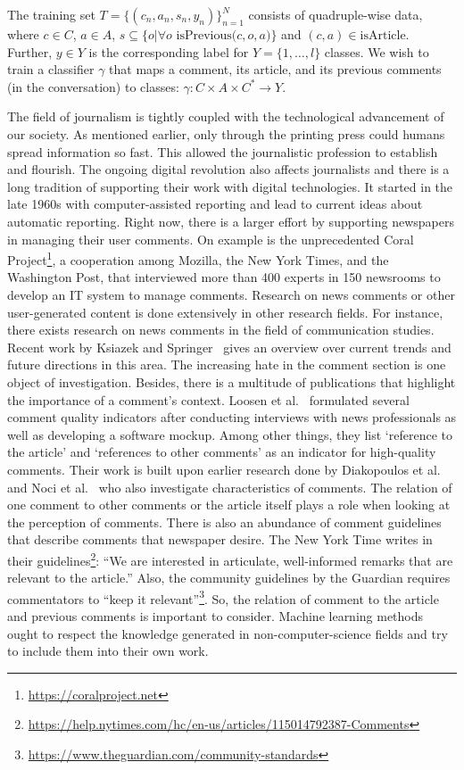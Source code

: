 The training set $T =\{(c_n, a_n, s_n, y_n)\}^N_{n=1}$ consists of quadruple-wise data, where $c \in C$, $a \in A$, $s \subseteq \{o | \forall o \text{ isPrevious(}c,o,a)\}$ and $(c, a) \in \text{isArticle}$.
Further, $y \in Y $ is the corresponding label for $Y=\{1,\dotsc, l\}$ classes.
We wish to train a classifier $\gamma$ that maps a comment, its article, and its previous comments (in the conversation) to classes: $\gamma: C \times A \times C^* \rightarrow Y$.

The field of journalism is tightly coupled with the technological advancement of our society. As mentioned earlier, only through the printing press could humans spread information so fast. This allowed the journalistic profession to establish and flourish. The ongoing digital revolution also affects journalists and there is a long tradition of supporting their work with digital technologies. It started in the late 1960s with computer-assisted reporting and lead to current ideas about automatic reporting. Right now, there is a larger effort by supporting newspapers in managing their user comments. On example is the unprecedented Coral Project\footnote{\url{https://coralproject.net}}, a cooperation among Mozilla, the New York Times, and the Washington Post, that interviewed more than 400 experts in 150 newsrooms to develop an IT system to manage comments. Research on news comments or other user-generated content is done extensively in other research fields. For instance, there exists research on news comments in the field of communication studies. Recent work by Ksiazek and Springer~\cite{eldridge_ii_user_2018} gives an overview over current trends and future directions in this area. The increasing hate in the comment section is one object of investigation. Besides, there is a multitude of publications that highlight the importance of a comment's context. Loosen et al.~\cite{loosen_making_2017} formulated several comment quality indicators after conducting interviews with news professionals as well as developing a software mockup. Among other things, they list `reference to the article' and `references to other comments' as an indicator for high-quality comments. Their work is built upon earlier research done by Diakopoulos et al.~\cite{Diakopoulos:2011:TQD:1958824.1958844} and Noci et al.~\cite{noci2012comments} who also investigate characteristics of comments. The relation of one comment to other comments or the article itself plays a role when looking at the perception of comments. There is also an abundance of comment guidelines that describe comments that newspaper desire. The New York Time writes in their guidelines\footnote{\url{https://help.nytimes.com/hc/en-us/articles/115014792387-Comments}}: ``We are interested in articulate, well-informed remarks that are relevant to the article.'' Also, the community guidelines by the Guardian requires commentators to ``keep it relevant''\footnote{\url{https://www.theguardian.com/community-standards}}.
So, the relation of comment to the article and previous comments is important to consider. Machine learning methods ought to respect the knowledge generated in non-computer-science fields and try to include them into their own work.

